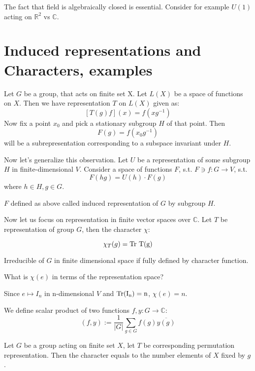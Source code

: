 \documentclass{amsart}
\def\Tr{\rm Tr}
\begin{document}
\begin{note} The fact that field is algebraically closed is essential. Consider for example $U(1)$ acting on $\mathbb{R}^2$ vs $\mathbb{C}$.
\end{note}
\section{Induced representations and Characters, examples}

Let $G$ be a group, that acts on finite set X. Let $L(X)$ be a space of functions on $X$. Then we have representation $T$ on $L(X)$ given as:
$$\left[T(g) f\right] (x) = f (x g^{-1}) $$
Now fix a point $x_0$ and pick a stationary subgroup $H$ of that point. Then
$$ F(g) = f(x_0 g^{-1}) $$
will be a subrepresentation corresponding to a subspace invariant under $H$.

Now let's generalize this observation. Let $U$ be a representation of some subgroup $H$ in finite-dimensional $V$.
Consider a space of functions $F$, s.t. $F\ni f: G \to V$, s.t.
$$F(hg) = U(h) \cdot F(g)$$
where $h\in H, g \in G$.

\begin{definition}
    $F$ defined as above called induced representation of $G$ by subgroup $H$.
\end{definition}

Now let us focus on representation in finite vector spaces over $\mathbb{C}$.
Let $T$ be representation of group $G$, then the character $\chi$:
\begin{definition}
    $$\chi_T (g) = \Tr \ T (g) $$
\end{definition}
\begin{theorem}
Irreducible of $G$ in finite dimensional space if fully defined by character function.
\end{theorem}
What is $\chi (e)$ in terms of the representation space?

Since $e \mapsto I_n$ in n-dimensional $V$ and $\Tr (I_n) = n$, $\chi(e) = n$.

\begin{definition} 
    We define scalar product of two functions $f,y: G \to \mathbb{C}$:
    $$(f,y) := \frac{1}{|G|} \sum_{g \in G} f(g) \overline{y(g)}$$
\end{definition}

\begin{lemma}
    Let $G$ be a group acting on finite set $X$, let $T$ be corresponding permutation representation. Then the character equals to the number elements of $X$ fixed by $g$.
\end{lemma}
\end{document}
